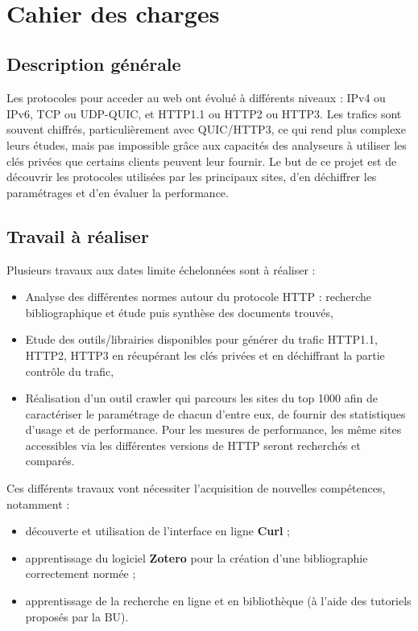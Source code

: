 \documentclass[a4paper,12pt]{article}
\begin{document}
~

\tableofcontents

\newpage

\section{Cahier des charges}


\subsection{Description générale}
Les protocoles pour acceder au web ont évolué à différents niveaux : IPv4 ou IPv6, TCP ou UDP-QUIC, et HTTP1.1 ou HTTP2 ou HTTP3. Les trafics sont souvent chiffrés, particulièrement avec QUIC/HTTP3, ce qui rend plus complexe leurs études, mais pas impossible grâce aux capacités des analyseurs à utiliser les clés privées que certains clients peuvent leur fournir. Le but de ce projet est de découvrir les protocoles utilisées par les principaux sites, d'en déchiffrer les paramétrages et d'en évaluer la performance.

\subsection{Travail à réaliser}
Plusieurs travaux aux dates limite échelonnées sont à réaliser :
\begin{itemize}
\item Analyse des différentes normes autour du protocole HTTP : recherche bibliographique et étude puis synthèse des documents trouvés,
\item Etude des outils/librairies disponibles pour générer du trafic HTTP1.1, HTTP2, HTTP3 en récupérant les clés privées et en déchiffrant la partie contrôle du trafic,
\item Réalisation d'un outil crawler qui parcours les sites du top 1000 afin de caractériser le paramétrage de chacun d'entre eux, de fournir des statistiques d'usage et de performance. Pour les mesures de performance, les même sites accessibles via les différentes versions de HTTP seront recherchés et comparés.
\end{itemize}
Ces différents travaux vont nécessiter l'acquisition de nouvelles compétences, notamment :
\begin{itemize}
\item découverte et utilisation de l'interface en ligne \textbf{Curl} ;
\item apprentissage du logiciel \textbf{Zotero} pour la création d'une bibliographie correctement normée ;
\item apprentissage de la recherche en ligne et en bibliothèque (à l'aide des tutoriels proposés par la BU).
\end{itemize}
\end{document}
